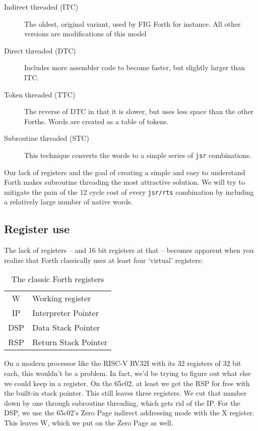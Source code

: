 \begin{description}
        \item [Indirect threaded (ITC)] The oldest, original variant, used by FIG
                Forth for instance. All other versions are
                modifications of this model
        \item [Direct threaded (DTC)] Includes more assembler code to become faster, but
                slightly larger than ITC. 
        \item [Token threaded (TTC)] The reverse of DTC in that it is slower, but uses
                less space than the other Forths. Words are created as a table
                of tokens.
        \item [Subroutine threaded (STC)] This technique converts the words to a simple
                series of \texttt{jsr} combinations. 
\end{description}

Our lack of registers and the goal of creating a simple and easy to understand
Forth makes subroutine threading the most attractive solution. We will try to
mitigate the pain of the 12 cycle cost of every \texttt{jsr/rts} combination by
including a relatively large number of native words. 

\subsection{Register use}

The lack of registers -- and 16 bit registers at that -- becomes apparent when
you realize that Forth classically uses at least four `virtual' registers:

\begin{table}[h !]
        \centering
        \label{tab:registers}
        \begin{tabular}{| c | l |}
                \hline
                W   & Working register\\
                IP  & Interpreter Pointer\\
                DSP & Data Stack Pointer\\
                RSP & Return Stack Pointer\\
                \hline
        \end{tabular}
        \caption{The classic Forth registers}
\end{table}

On a modern processor like the RISC-V RV32I with its 32 registers
of 32 bit each, this wouldn't be a problem. In fact, we'd be trying to figure
out what else we could keep in a register. On the 65c02, at least we get the RSP
for free with the built-in stack pointer. This still leaves three registers. We
cut that number down by one through subroutine threading, which gets rid of the
IP. For the DSP, we use the 65c02's Zero Page indirect
addressing mode with the X register. This leaves W, which we
put on the Zero Page as well. 


